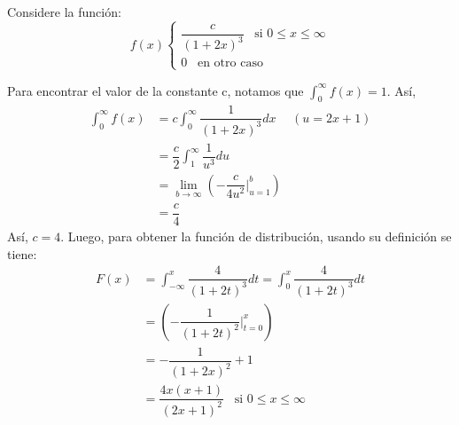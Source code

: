 
\addpoints
\question[10] Considere la función:
$$f(x)
\begin{cases}
\dfrac{c}{(1+2x)^3}\hspace{10pt} \text{si } 0\leq x \leq \infty\\
0 \hspace{10pt} \text{en otro caso}
\end{cases}
$$
\noaddpoints
{}
\begin{solution}
Para encontrar el valor de la constante c, notamos que $\int_{0}^{\infty} f(x)=1$. Así,
\begin{align*}
\int_{0}^{\infty} f(x)&= c \int_{0}^{\infty} \dfrac{1}{(1+2x)^3} dx \hspace{15pt} (u=2x+1)\\
&= \dfrac{c}{2} \int_{1}^{\infty} \dfrac{1}{u^3} du \\
&= \lim_{b\rightarrow\infty} \left( -\dfrac{c}{4u^2} \bigg\vert_{u=1}^{b}\right) \\
&= \dfrac{c}{4}
\end{align*}
Así, $c=4$. Luego, para obtener la función de distribución, usando su definición se tiene:
\begin{align*}
F(x)&=\int_{-\infty}^{x} \dfrac{4}{(1+2t)^3} dt= \int_{0}^{x} \dfrac{4}{(1+2t)^3} dt \\
&= \left( -\dfrac{1}{(1+2t)^2} \bigg\vert_{t=0}^{x}\right)\\
&= -\dfrac{1}{(1+2x)^2} + 1\\
&= \dfrac{4x(x+1)}{(2x+1)^2} \hspace{10pt} \text{si } 0\leq x \leq \infty
\end{align*}
\end{solution}